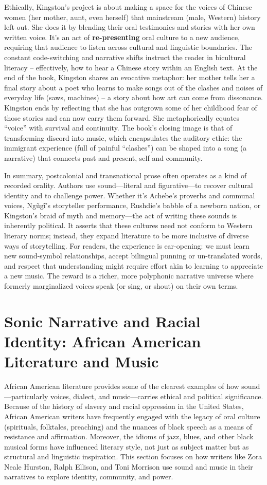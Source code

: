 \documentclass[12pt]{report}
\begin{document}
Ethically, Kingston’s project is about making a space for the voices of Chinese women (her mother, aunt, even herself) that mainstream (male, Western) history left out. She does it by blending their oral testimonies and stories with her own written voice. It’s an act of \textbf{re-presenting} oral culture to a new audience, requiring that audience to listen across cultural and linguistic boundaries. The constant code-switching and narrative shifts instruct the reader in bicultural literacy – effectively, how to hear a Chinese story within an English text. At the end of the book, Kingston shares an evocative metaphor: her mother tells her a final story about a poet who learns to make songs out of the clashes and noises of everyday life (saws, machines) – a story about how art can come from dissonance. Kingston ends by reflecting that she has outgrown some of her childhood fear of those stories and can now carry them forward. She metaphorically equates “voice” with survival and continuity. The book’s closing image is that of transforming discord into music, which encapsulates the auditory ethic: the immigrant experience (full of painful “clashes”) can be shaped into a song (a narrative) that connects past and present, self and community.

In summary, postcolonial and transnational prose often operates as a kind of recorded orality. Authors use sound—literal and figurative—to recover cultural identity and to challenge power. Whether it’s Achebe’s proverbs and communal voices, Ngũgĩ’s storyteller performance, Rushdie’s babble of a newborn nation, or Kingston’s braid of myth and memory—the act of writing these sounds is inherently political. It asserts that these cultures need not conform to Western literary norms; instead, they expand literature to be more inclusive of diverse ways of storytelling. For readers, the experience is ear-opening: we must learn new sound-symbol relationships, accept bilingual punning or un-translated words, and respect that understanding might require effort akin to learning to appreciate a new music. The reward is a richer, more polyphonic narrative universe where formerly marginalized voices speak (or sing, or shout) on their own terms.

\section{Sonic Narrative and Racial Identity: African American Literature and Music}
African American literature provides some of the clearest examples of how sound—particularly voices, dialect, and music—carries ethical and political significance. Because of the history of slavery and racial oppression in the United States, African American writers have frequently engaged with the legacy of oral culture (spirituals, folktales, preaching) and the nuances of black speech as a means of resistance and affirmation. Moreover, the idioms of jazz, blues, and other black musical forms have influenced literary style, not just as subject matter but as structural and linguistic inspiration. This section focuses on how writers like Zora Neale Hurston, Ralph Ellison, and Toni Morrison use sound and music in their narratives to explore identity, community, and power.
\end{document}
